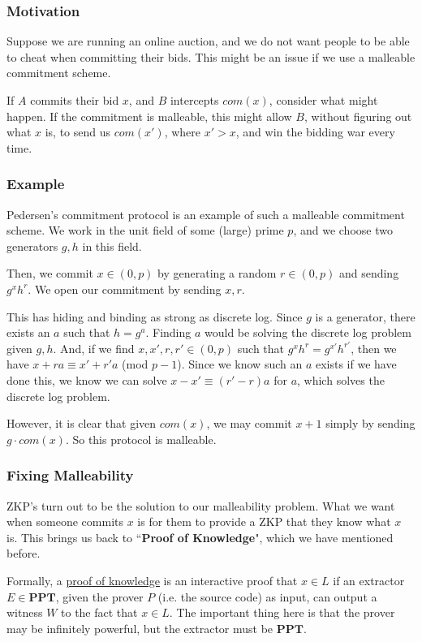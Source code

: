 \documentclass[11pt]{article}
\newcommand{\PPT}{\mathbf{PPT}}
\begin{document}
\subsubsection{Motivation}
Suppose we are running an online auction, and we do not want people to be able to cheat when committing their bids. This might be an issue if we use a malleable commitment scheme.\smallskip

If \(A\) commits their bid \(x\), and \(B\) intercepts \(com(x)\), consider what might happen. If the commitment is malleable, this might allow \(B\), without figuring out what \(x\) is, to send us \(com(x')\), where \(x'>x\), and win the bidding war every time.

\subsubsection{Example}
Pedersen's commitment protocol is an example of such a malleable commitment scheme. We work in the unit field of some (large) prime \(p\), and we choose two generators \(g,h\) in this field.\smallskip

 Then, we commit \(x\in(0,p)\) by generating a random \(r\in(0,p)\) and sending \(g^xh^r\). We open our commitment by sending \(x,r\).\smallskip

This has hiding and binding as strong as discrete log. Since \(g\) is a generator, there exists an \(a\) such that \(h=g^a\). Finding \(a\) would be solving the discrete log problem given \(g,h\). And, if we find \(x,x',r,r'\in(0,p)\) such that \(g^xh^r=g^{x'}h^{r'}\), then we have \(x+ra \equiv x'+r'a\) (mod \(p-1\)). Since we know such an \(a\) exists if we have done this, we know we can solve \(x-x'\equiv (r'-r)a\) for \(a\), which solves the discrete log problem.\medskip

However, it is clear that given \(com(x)\), we may commit \(x+1\) simply by sending \(g\cdot com(x)\). So this protocol is malleable.

\subsubsection{Fixing Malleability}
ZKP's turn out to be the solution to our malleability problem. What we want when someone commits \(x\) is for them to provide a ZKP that they know what \(x\) is. This brings us back to ``\textbf{Proof of Knowledge}", which we have mentioned before.\medskip

Formally, a \underline{proof of knowledge} is an interactive proof that \(x\in L\) if an extractor \(E\in\PPT\), given the prover \(P\) (i.e. the source code) as input, can output a witness \(W\) to the fact that \(x\in L\). The important thing here is that the prover may be infinitely powerful, but the extractor must be \(\PPT\).
\end{document}
